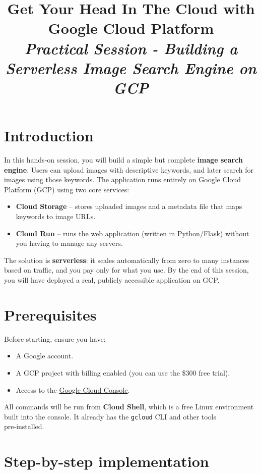\documentclass[12pt,a4paper]{article}
\title{\textbf{Get Your Head In The Cloud with Google Cloud Platform} \\ \textit{Practical Session - Building a Serverless Image Search Engine on GCP}}
\date{}
\begin{document}
\maketitle

\tableofcontents
\newpage

\section{Introduction}
In this hands‑on session, you will build a simple but complete \textbf{image search engine}. Users can upload images with descriptive keywords, and later search for images using those keywords. The application runs entirely on Google Cloud Platform (GCP) using two core services:

\begin{itemize}
    \item \textbf{Cloud Storage} – stores uploaded images and a metadata file that maps keywords to image URLs.
    \item \textbf{Cloud Run} – runs the web application (written in Python/Flask) without you having to manage any servers.
\end{itemize}

The solution is \textbf{serverless}: it scales automatically from zero to many instances based on traffic, and you pay only for what you use. By the end of this session, you will have deployed a real, publicly accessible application on GCP.

\section{Prerequisites}
Before starting, ensure you have:
\begin{itemize}
    \item A Google account.
    \item A GCP project with billing enabled (you can use the \$300 free trial).
    \item Access to the \href{https://console.cloud.google.com}{Google Cloud Console}.
\end{itemize}
All commands will be run from \textbf{Cloud Shell}, which is a free Linux environment built into the console. It already has the \texttt{gcloud} CLI and other tools pre‑installed.

\section{Step-by-step implementation}
\end{document}
